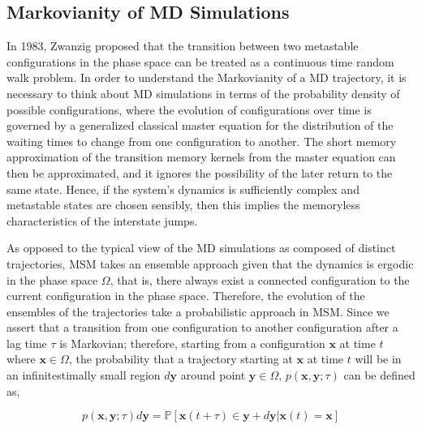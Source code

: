 \begin{spacing}{2.0}
    \section{Markovianity of MD Simulations}

    In 1983, Zwanzig proposed that the transition between two metastable configurations in the phase space can be treated as a continuous time 
    random walk problem. \cite{P-JStatPhys-1983-v30-Zwanzig} In order to understand the Markovianity of a MD trajectory, it is necessary to think 
    about MD simulations in terms of the probability density of possible configurations, where the evolution of configurations over time is governed 
    by a generalized classical master equation for the distribution of the waiting times to change from one configuration to another. The short memory 
    approximation of the transition memory kernels from the master equation can then be approximated, and it ignores the possibility of the later 
    return to the same state. Hence, if the system's dynamics is sufficiently complex and metastable states are chosen sensibly, then this implies 
    the memoryless characteristics of the interstate jumps. \cite{P-JStatPhys-1983-v30-Zwanzig}

    As opposed to the typical view of the MD simulations as composed of distinct trajectories, MSM takes an ensemble approach given that the dynamics 
    is ergodic in the phase space $\Omega$, that is, there always exist a connected configuration to the current configuration in the phase space. 
    Therefore, the evolution of the ensembles of the trajectories take a probabilistic approach in MSM. Since we assert that a transition from one 
    configuration to another configuration after a lag time $\tau$ is Markovian; therefore, starting from a configuration $\mathbf{x}$ at time $t$
    where $\mathbf{x} \in \Omega$, the probability that a trajectory starting at $\mathbf{x}$ at time $t$ will be in an infinitestimally small
    region $d\mathbf{y}$ around point $\mathbf{y} \in \Omega$, $p(\mathbf{x}, \mathbf{y}; \tau)$ can be defined as, 
    \cite{P-JChemPhys-2011-v134-Prinz, P-PhysChemChemPhys-2011-v13-Prinz}

    \begin{equation}
        p(\mathbf{x}, \mathbf{y}; \tau)d\mathbf{y} = \mathbb{P}[\mathbf{x}(t+\tau)\in\mathbf{y}+d\mathbf{y}|\mathbf{x}(t)=\mathbf{x}]
        \label{eq:msm-prob-def}
    \end{equation}


\end{spacing}
